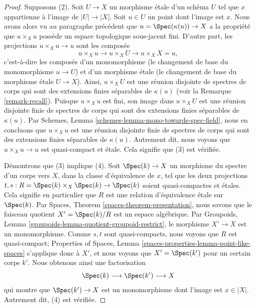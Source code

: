 \begin{proof}
\medskip\noindent
Supposons (2). Soit $U \to X$ un morphisme étale d'un schéma $U$
tel que $x$ appartienne à l'image de $|U| \to |X|$. Soit $u \in U$ un
point dont l'image est $x$. Nous avons alors vu au paragraphe précédent que
$u = \Spec(\kappa(u)) \to X$ a la propriété que
$u \times_X u$ possède un espace topologique sous-jacent fini. D'autre part,
les projections $u \times_X u \to u$ sont les composés
$$
u \times_X u \longrightarrow
u \times_X U \longrightarrow
u \times_X X = u,
$$
c'est-à-dire les composés d'un monomorphisme (le changement de base du
monomorphisme $u \to U$) et d'un morphisme étale (le changement de base du
morphisme étale $U \to X$). Ainsi, $u \times_X U$ est une réunion disjointe
de spectres de corps qui sont des extensions finies séparables de $\kappa(u)$
(voir la Remarque \ref{remark-recall}). Puisque $u \times_X u$ est fini, son
image dans $u \times_X U$ est une réunion disjointe finie de spectres de corps
qui sont des extensions finies séparables de $\kappa(u)$. Par
Schemes, Lemma \ref{schemes-lemma-mono-towards-spec-field},
nous en concluons que $u \times_X u$ est une réunion disjointe finie de
spectres de corps qui sont des extensions finies séparables de $\kappa(u)$.
Autrement dit, nous voyons que $u \times_X u \to u$ est quasi-compact et
étale. Cela signifie que (3) est vérifiée.

\medskip\noindent
Démontrons que (3) implique (4). Soit $\Spec(k) \to X$ un morphisme
du spectre d'un corps vers $X$, dans la classe d'équivalence de $x$,
tel que les deux projections
$t, s : R = \Spec(k) \times_X \Spec(k)  \to \Spec(k)$
soient quasi-compactes et étales.
Cela signifie en particulier que $R$ est une relation d'équivalence étale
sur $\Spec(k)$.
Par Spaces, Theorem \ref{spaces-theorem-presentation},
nous savons que le faisceau quotient
$X' = \Spec(k)/R$ est un espace algébrique. Par
Groupoids, Lemma \ref{groupoids-lemma-quotient-groupoid-restrict},
le morphisme $X' \to X$ est un monomorphisme.
Comme $s, t$ sont quasi-compacts, nous voyons que $R$ est quasi-compact;
Properties of Spaces,
Lemma \ref{spaces-properties-lemma-point-like-spaces}
s'applique donc à $X'$, et nous voyons que
$X' = \Spec(k')$ pour un certain corps $k'$. Nous obtenons ainsi une
factorisation
$$
\Spec(k) \longrightarrow
\Spec(k') \longrightarrow X
$$
qui montre que $\Spec(k') \to X$ est un monomorphisme dont l'image est
$x \in |X|$. Autrement dit, (4) est vérifiée.


\end{proof}
